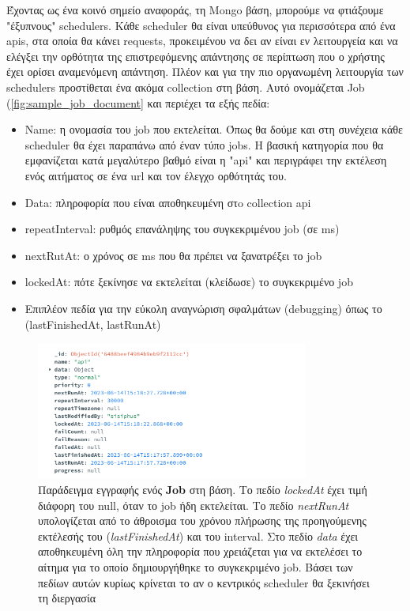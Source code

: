 Έχοντας ως ένα κοινό σημείο αναφοράς, τη Mongo βάση, μπορούμε να φτιάξουμε "έξυπνους" schedulers.
Κάθε scheduler θα είναι υπεύθυνος για περισσότερα από ένα apis, στα οποία θα κάνει requests, προκειμένου να δει αν είναι εν λειτουργεία και να ελέγξει την ορθότητα της επιστρεφόμενης απάντησης σε περίπτωση που ο χρήστης έχει ορίσει αναμενόμενη απάντηση. Πλέον και για την πιο οργανωμένη λειτουργία των schedulers προστίθεται ένα ακόμα collection στη βάση. Αυτό ονομάζεται Job (\autoref{fig:sample_job_document} και περιέχει τα εξής πεδία:

\begin{itemize}
    \item Name: η ονομασία του job που εκτελείται. Όπως θα δούμε και στη συνέχεια κάθε scheduler θα έχει παραπάνω από έναν τύπο jobs. Η βασική κατηγορία που θα εμφανίζεται κατά μεγαλύτερο βαθμό είναι η "api" και περιγράφει την εκτέλεση ενός αιτήματος σε ένα url και τον έλεγχο ορθότητάς του.
    \item Data: πληροφορία που είναι αποθηκευμένη στo collection api
    \item repeatInterval: ρυθμός επανάληψης του συγκεκριμένου job (σε ms)
    \item nextRutAt: ο χρόνος σε ms που θα πρέπει να ξανατρέξει το job
    \item lockedAt: πότε ξεκίνησε να εκτελείται (κλείδωσε) το συγκεκριμένο job
    \item Επιπλέον πεδία για την εύκολη αναγνώριση σφαλμάτων (debugging) όπως το (lastFinishedAt, lastRunAt)
\end{itemize}

\begin{figure}[!ht]
	\centering
	\includegraphics[width=0.8\textwidth]{./images/chapter4/sample_job_document.png}
	\caption[Παράδειγμα εγγραφής ενός \textbf{Job} στη βάση]{Παράδειγμα εγγραφής ενός \textbf{Job} στη βάση. Tο πεδίο \textit{lockedAt} έχει τιμή διάφορη του null, όταν το job ήδη εκτελείται.
		Το πεδίο \textit{nextRunAt} υπολογίζεται από το άθροισμα του χρόνου πλήρωσης της προηγούμενης εκτέλεσής του (\textit{lastFinishedAt}) και του interval. Στο πεδίο \textit{data}
		έχει αποθηκευμένη όλη την πληροφορία που χρειάζεται για να εκτελέσει το αίτημα για το οποίο δημιουργήθηκε το συγκεκριμένο job. Βάσει των πεδίων αυτών κυρίως κρίνεται το αν ο
		κεντρικός scheduler θα ξεκινήσει τη διεργασία}
	\label{fig:sample_job_document}
\end{figure}


